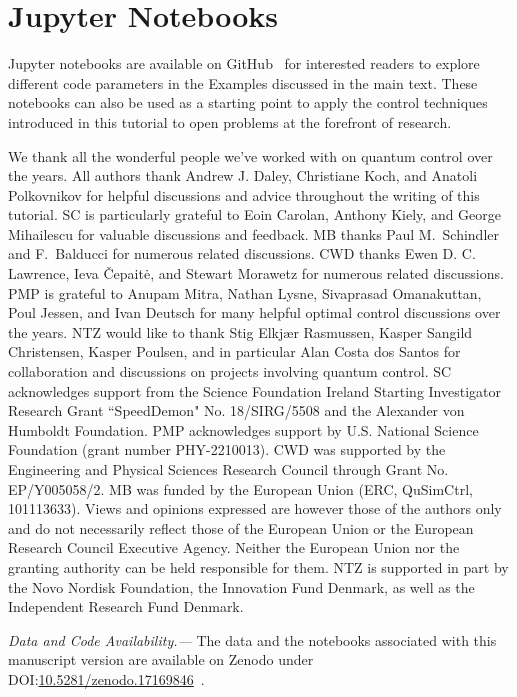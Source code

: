 \section*{Jupyter Notebooks}

Jupyter notebooks are available on GitHub~\cite{github_code} for interested readers to explore different code parameters in the Examples discussed in the main text. These notebooks can also be used as a starting point to apply the control techniques introduced in this tutorial to open problems at the forefront of research. 

\acknowledgments
We thank all the wonderful people we've worked with on quantum control over the years. All authors thank Andrew J. Daley, Christiane Koch, and Anatoli Polkovnikov for helpful discussions and advice throughout the writing of this tutorial.
SC is particularly grateful to Eoin Carolan, Anthony Kiely, and George Mihailescu for valuable discussions and feedback. MB thanks Paul M.~Schindler and F.~Balducci for numerous related discussions. CWD thanks Ewen D. C. Lawrence, Ieva \v Cepait\.e, and Stewart Morawetz for numerous related discussions. PMP is grateful to Anupam Mitra, Nathan Lysne, Sivaprasad Omanakuttan, Poul Jessen, and Ivan Deutsch for many helpful optimal control discussions over the years. NTZ would like to thank Stig Elkj{\ae}r Rasmussen, Kasper Sangild Christensen, Kasper Poulsen, and in particular Alan Costa dos Santos for collaboration and discussions on projects involving quantum control.
SC acknowledges support from the Science Foundation Ireland Starting Investigator Research Grant ``SpeedDemon" No. 18/SIRG/5508 and the Alexander von Humboldt Foundation. PMP acknowledges support by U.S. National Science
Foundation (grant number PHY-2210013). CWD was supported by the Engineering and Physical Sciences Research Council through Grant No. EP/Y005058/2. MB was funded by the European Union (ERC, QuSimCtrl, 101113633). Views and opinions expressed are however those of the authors only and do not necessarily reflect those of the European Union or the European Research Council Executive Agency. Neither the European Union nor the granting authority can be held responsible for them. NTZ is supported in part by the Novo Nordisk Foundation, the Innovation Fund Denmark, as well as the Independent Research Fund Denmark. 

\textit{Data and Code Availability.---} The data and the notebooks associated with this manuscript version are available on Zenodo under DOI:\href{https://doi.org/10.5281/zenodo.17169846}{10.5281/zenodo.17169846}~\cite{zenodo_record}.

